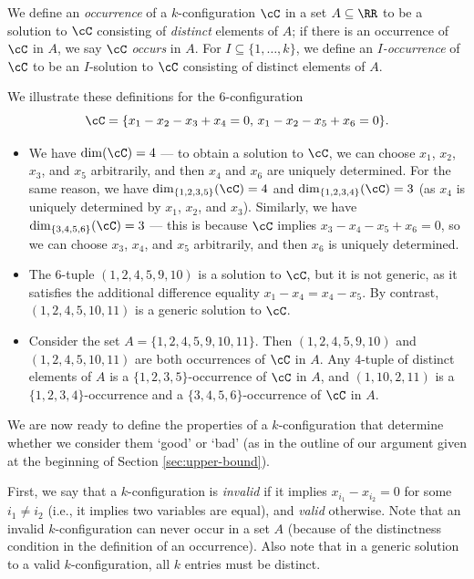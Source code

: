We define an \emph{occurrence} of a $k$-configuration $\cC$ in a set $A \subseteq \RR$ to be a solution to $\cC$ consisting of \emph{distinct} elements of $A$; if there is an occurrence of $\cC$ in $A$, we say $\cC$ \emph{occurs} in $A$. For $I \subseteq \{1, \ldots, k\}$, we define an \emph{$I$-occurrence} of $\cC$ to be an $I$-solution to $\cC$ consisting of distinct elements of $A$. 

\begin{example}
    We illustrate these definitions for the $6$-configuration \[\cC = \{x_1 - x_2 - x_3 + x_4 = 0, \, x_1 - x_2 - x_5 + x_6 = 0\}.\]
    \begin{itemize}
        \item We have $\dim(\cC) = 4$ --- to obtain a solution to $\cC$, we can choose $x_1$, $x_2$, $x_3$, and $x_5$ arbitrarily, and then $x_4$ and $x_6$ are uniquely determined. For the same reason, we have $\dim_{\{1, 2, 3, 5\}}(\cC) = 4$ and $\dim_{\{1, 2, 3, 4\}}(\cC) = 3$ (as $x_4$ is uniquely determined by $x_1$, $x_2$, and $x_3$). Similarly, we have $\dim_{\{3, 4, 5, 6\}}(\cC) = 3$ --- this is because $\cC$ implies $x_3 - x_4 - x_5 + x_6 = 0$, so we can choose $x_3$, $x_4$, and $x_5$ arbitrarily, and then $x_6$ is uniquely determined. 
        \item The $6$-tuple $(1, 2, 4, 5, 9, 10)$ is a solution to $\cC$, but it is not generic, as it satisfies the additional difference equality $x_1 - x_4 = x_4 - x_5$. By contrast, $(1, 2, 4, 5, 10, 11)$ is a generic solution to $\cC$.  
        \item Consider the set $A = \{1, 2, 4, 5, 9, 10, 11\}$. Then $(1, 2, 4, 5, 9, 10)$ and $(1, 2, 4, 5, 10, 11)$ are both occurrences of $\cC$ in $A$. Any $4$-tuple of distinct elements of $A$ is a $\{1, 2, 3, 5\}$-occurrence of $\cC$ in $A$, and $(1, 10, 2, 11)$ is a $\{1, 2, 3, 4\}$-occurrence and a $\{3, 4, 5, 6\}$-occurrence of $\cC$ in $A$. 
    \end{itemize}
\end{example}

We are now ready to define the properties of a $k$-configuration that determine whether we consider them `good' or `bad' (as in the outline of our argument given at the beginning of Section \ref{sec:upper-bound}). 

First, we say that a $k$-configuration is \emph{invalid} if it implies $x_{i_1} - x_{i_2} = 0$ for some $i_1 \neq i_2$ (i.e., it implies two variables are equal), and \emph{valid} otherwise. Note that an invalid $k$-configuration can never occur in a set $A$ (because of the distinctness condition in the definition of an occurrence). Also note that in a generic solution to a valid $k$-configuration, all $k$ entries must be distinct. 


